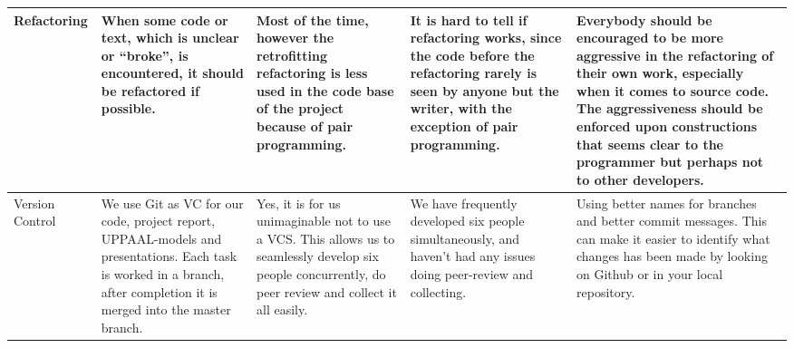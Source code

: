 \begin{sidewaystable}
\begin{tabularx}{\textwidth}{|l|X|X|X|X|}
Refactoring      & When some code or text, which is unclear or ``broke'', is encountered, it should be refactored if possible.                                                                                                                  & Most of the time, however the retrofitting refactoring is less used in the code base of the project because of pair programming.                                                                                                                                & It is hard to tell if refactoring works, since the code before the refactoring rarely is seen by anyone but the writer, with the exception of pair programming.                                                                                                                                                                                                                    & Everybody should be encouraged to be more aggressive in the refactoring of their own work, especially when it comes to source code. The aggressiveness should be enforced upon constructions that seems clear to the programmer but perhaps not to other developers.                            \\ \hline
Version Control  & We use Git as VC for our code, project report, UPPAAL-models and presentations. Each task is worked in a branch, after completion it is merged into the master branch.                                                      & Yes, it is for us unimaginable not to use a VCS. This allows us to seamlessly develop six people concurrently, do peer review and collect it all easily.                                                                                                        & We have frequently developed six people simultaneously, and haven't had any issues doing peer-review and collecting.                                                                                                                                                                                                                                                                & Using better names for branches and better commit messages. This can make it easier to identify what changes has been made by looking on Github or in your local repository.                                                                                                                   \\ \hline

\end{tabularx}
\end{sidewaystable}
